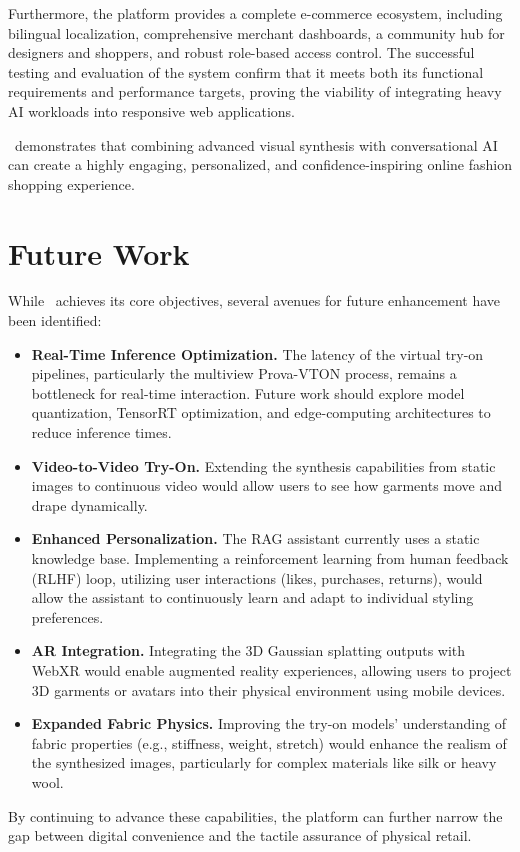 Furthermore, the platform provides a complete e-commerce ecosystem, including bilingual localization, comprehensive merchant dashboards, a community hub for designers and shoppers, and robust role-based access control. The successful testing and evaluation of the system confirm that it meets both its functional requirements and performance targets, proving the viability of integrating heavy AI workloads into responsive web applications.

\projectname\ demonstrates that combining advanced visual synthesis with conversational AI can create a highly engaging, personalized, and confidence-inspiring online fashion shopping experience.

\section{Future Work}
\label{sec:future-work}

While \projectname\ achieves its core objectives, several avenues for future enhancement have been identified:

\begin{itemize}[leftmargin=*]
    \item \textbf{Real-Time Inference Optimization.} The latency of the virtual try-on pipelines, particularly the multiview Prova-VTON process, remains a bottleneck for real-time interaction. Future work should explore model quantization, TensorRT optimization, and edge-computing architectures to reduce inference times.
    \item \textbf{Video-to-Video Try-On.} Extending the synthesis capabilities from static images to continuous video would allow users to see how garments move and drape dynamically.
    \item \textbf{Enhanced Personalization.} The RAG assistant currently uses a static knowledge base. Implementing a reinforcement learning from human feedback (RLHF) loop, utilizing user interactions (likes, purchases, returns), would allow the assistant to continuously learn and adapt to individual styling preferences.
    \item \textbf{AR Integration.} Integrating the 3D Gaussian splatting outputs with WebXR would enable augmented reality experiences, allowing users to project 3D garments or avatars into their physical environment using mobile devices.
    \item \textbf{Expanded Fabric Physics.} Improving the try-on models' understanding of fabric properties (e.g., stiffness, weight, stretch) would enhance the realism of the synthesized images, particularly for complex materials like silk or heavy wool.
\end{itemize}

By continuing to advance these capabilities, the platform can further narrow the gap between digital convenience and the tactile assurance of physical retail.
